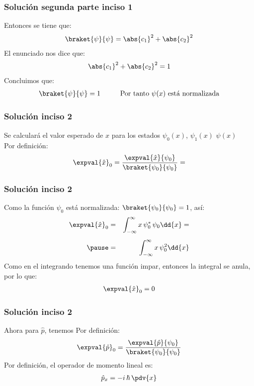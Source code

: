 \begin{frame}
\frametitle{Solución segunda parte inciso 1}
Entonces se tiene que:
\begin{align*}
\braket{\psi}{\psi} = \abs{c_{1}}^{2} + \abs{c_{2}}^{2}
\end{align*}
\pause
El enunciado nos dice que:
\begin{align*}
\abs{c_{1}}^{2} + \abs{c_{2}}^{2} = 1
\end{align*}
\pause
Concluimos que:
\begin{align*}
\braket{\psi}{\psi} = 1 \hspace{1cm} \mbox{Por tanto } \psi(x) \mbox{ está normalizada}
\end{align*}
\end{frame}
\begin{frame}
\frametitle{Solución inciso 2}
Se calculará el valor esperado de $x$ para los estados $\psi_{0}(x)$, $\psi_{1}(x)$  $\psi(x)$
\\
\bigskip
\pause
Por definición:
\begin{align*}
\expval{\hat{x}}_{0} = \dfrac{\expval{\hat{x}}{\psi_{0}}}{\braket{\psi_{0}}{\psi_{0}}} = 
\end{align*}
\end{frame}
\begin{frame}
\frametitle{Solución inciso 2}
Como la función $\psi_{0}$ está normalizada: $\braket{\psi_{0}}{\psi_{0}} = 1$, así:
\pause
\begin{eqnarray*}
\expval{\hat{x}}_{0} &=& \int_{-\infty}^{\infty} x \, \psi_{0}^{*} \, \psi_{0} \dd{x} = \\[0.5em] \pause
&=& \int_{-\infty}^{\infty} x \, \psi_{0}^{2} \dd{x}
\end{eqnarray*}
\pause
Como en el integrando tenemos una función impar, entonces la integral se anula, por lo que:
\begin{align*}
\expval{\hat{x}}_{0} = 0
\end{align*}
\end{frame}
\begin{frame}
\frametitle{Solución inciso 2}
Ahora para $\hat{p}$, tenemos
Por definición:
\begin{align*}
\expval{\hat{p}}_{0} = \dfrac{\expval{\hat{p}}{\psi_{0}}}{\braket{\psi_{0}}{\psi_{0}}}
\end{align*}
\pause
Por definición, el operador de momento lineal es:
\begin{align*}
\hat{p}_{x} = - i \, \hbar \, \pdv{x}
\end{align*}
\end{frame}
